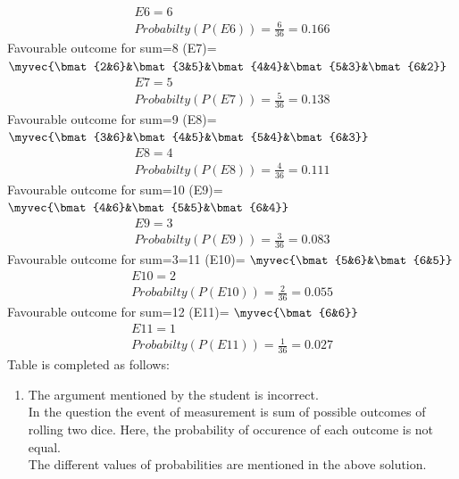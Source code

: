 \begin{enumerate}[label=\arabic*.,ref=\thesubsubsection.\theenumi]
\begin{enumerate}
\begin{align}
E6=6
\\
Probabilty(P(E6))=\frac{6}{36}=0.166
\end{align}
Favourable outcome for sum=8 (E7)= 
$\myvec{\bmat{2&6}&\bmat{3&5}&\bmat{4&4}&\bmat{5&3}&\bmat{6&2}}$
\begin{align}
E7=5
\\
Probabilty(P(E7))=\frac{5}{36}=0.138
\end{align}
Favourable outcome for sum=9 (E8)= 
$\myvec{\bmat{3&6}&\bmat{4&5}&\bmat{5&4}&\bmat{6&3}}$
\begin{align}
E8=4
\\
Probabilty(P(E8))=\frac{4}{36}=0.111
\end{align}
Favourable outcome for sum=10 (E9)= 
$\myvec{\bmat{4&6}&\bmat{5&5}&\bmat{6&4}}$
\begin{align}
E9=3 
\\
Probabilty(P(E9))=\frac{3}{36}=0.083
\end{align}
Favourable outcome for sum=3=11 (E10)= 
$\myvec{\bmat{5&6}&\bmat{6&5}}$
\begin{align}
E10=2
\\
Probabilty(P(E10))=\frac{2}{36}=0.055
\end{align}
Favourable outcome for sum=12 (E11)=
$\myvec{\bmat{6&6}}$
\begin{align}
E11=1
\\
Probabilty(P(E11))=\frac{1}{36}=0.027
\end{align}
Table is completed as follows:
\end{enumerate}
\begin{enumerate}
\item The argument mentioned by the student is incorrect.
\\
In the question the event of measurement is sum of possible outcomes of rolling two dice.
Here, the probability of occurence of each outcome is not equal. 
\\
The different values of probabilities are mentioned in the above solution.
\\

\end{enumerate}
\end{enumerate}
